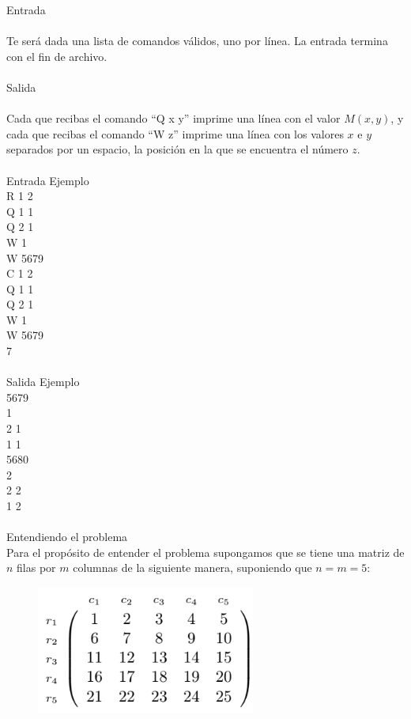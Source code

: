 \documentclass[12pt]{article}
\begin{document}
Entrada\\
\\Te será dada una lista de comandos válidos, uno por línea. La entrada termina con el fin de archivo.\\
\\
\textrm{\large Salida}
\\
\\Cada que recibas el comando “Q x y” imprime una línea con el valor $M(x, y)$, y cada que recibas el comando “W z” imprime una línea con los valores $x$ e $y$ separados por un espacio, la posición en la que se encuentra el número $z$.
\\
\\
\textrm{\large Entrada Ejemplo}
\\
R 1 2\\
Q 1 1\\
Q 2 1\\
W 1\\
W 5679\\
C 1 2\\
Q 1 1\\
Q 2 1\\
W 1\\
W 5679\\
7\\
\\
\textrm{\large Salida Ejemplo}
\\
5679\\
1\\
2 1\\
1 1\\
5680\\
2\\
2 2\\
1 2\\
\\
\textrm{\large Entendiendo el problema}\\
Para el propósito de entender el problema supongamos que se tiene una matriz de $n$ filas por $m$ columnas de la siguiente manera, suponiendo que $n = m = 5$:\\
\begin{figure}[h!] 
\begin{center} 
\includegraphics[scale = .8]{a1.PNG}\hspace{50mm}  
\end{center} 
\end{figure}
\end{document}

